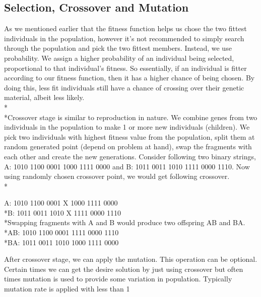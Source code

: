 \subsection{Selection, Crossover and Mutation}
As we mentioned earlier that the fitness function helps us chose the two fittest individuals in the population, however it’s not recommended to simply search through the population and pick the two fittest members. Instead, we use probability. We assign a higher probability of an individual being selected, proportional to that individual’s fitness. So essentially, if an individual is fitter according to our fitness function, then it has a higher chance of being chosen. By doing this, less fit individuals still have a chance of crossing over their genetic material, albeit less likely. 
\\*\\*Crossover stage is similar to reproduction in nature. We combine genes from two individuals in the population to make 1 or more new individuals (children). We pick two individuals with highest fitness value from the population, split them at random generated point (depend on problem at hand), swap the fragments with each other and create the new generations. Consider following two binary strings, A: 1010 1100 0001 1000 1111 0000 and B: 1011 0011 1010 1111 0000 1110. Now using randomly chosen crossover point, we would get following crossover. 
\\*
\begin{center}
A: 1010 1100 0001 X 1000 1111 0000
\\*B: 1011 0011 1010 X 1111 0000 1110
\vspace{2 mm}
\\*Swapping fragments with A and B would produce two offspring AB and BA.
\vspace{2 mm}
\\*AB: 1010 1100 0001 1111 0000 1110
\\*BA: 1011 0011 1010 1000 1111 0000
\end{center}
After crossover stage, we can apply the mutation. This operation can be optional. Certain times we can get the desire solution by just using crossover but often times mutation is used to provide some variation in population. Typically mutation rate is applied with less than 1%
